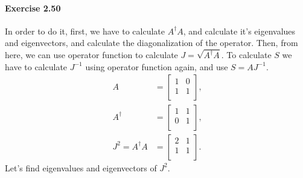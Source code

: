 \documentclass[a4paper,12pt]{article}
\newcommand{\exercise}[1]{\paragraph{Exercise #1}}
\begin{document}
    \exercise{2.50} In order to do it, first, we have to calculate $A^\dagger A$, and calculate it's eigenvalues and eigenvectors, and calculate the diagonalization of the operator. Then, from here, we can use operator function to calculate $J = \sqrt{A^\dagger A}$. To calculate $S$ we have to calculate $J^{-1}$ using operator function again, and use $S = A J^{-1}$.
    \begin{align}
        \nonumber
        A &=
        \begin{bmatrix}
            1 & 0\\
            1 & 1\\
        \end{bmatrix} \textrm{,}\\
        \nonumber
        A^\dagger &=
        \begin{bmatrix}
            1 & 1\\
            0 & 1\\
        \end{bmatrix} \textrm{,}\\
        J^2 = A^\dagger A &= 
        \begin{bmatrix}
            2 & 1\\
            1 & 1\\
        \end{bmatrix} \textrm{.}
    \end{align}
    Let's find eigenvalues and eigenvectors of $J^2$.
\end{document}
